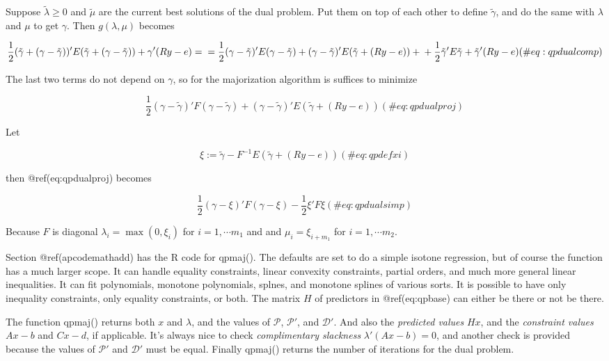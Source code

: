 \documentclass[
  12pt,
  letterpaper,
  DIV=11,
  numbers=noendperiod]{scrreprt}
\theoremstyle{remark}
\begin{document}
Suppose \(\tilde\lambda\geq 0\) and \(\tilde\mu\) are the current best
solutions of the dual problem. Put them on top of each other to define
\(\tilde\gamma\), and do the same with \(\lambda\) and \(\mu\) to get
\(\gamma\). Then \(g(\lambda,\mu)\) becomes

\begin{equation}
\frac12 (\tilde\gamma+(\gamma-\tilde\gamma))'E(\tilde\gamma+(\gamma-\tilde\gamma))+\gamma'(Ry-e)=\\
=\frac12(\gamma-\tilde\gamma)'E(\gamma-\tilde\gamma)+ (\gamma-\tilde\gamma)'E(\tilde\gamma+(Ry-e))+\\+\frac12\tilde\gamma'E\tilde\gamma+\tilde\gamma'(Ry-e)
(\#eq:qpdualcomp)
\end{equation}

The last two terms do not depend on \(\gamma\), so for the majorization
algorithm is suffices to minimize

\begin{equation}
\frac12(\gamma-\tilde\gamma)'F(\gamma-\tilde\gamma)+ (\gamma-\tilde\gamma)'E(\tilde\gamma+(Ry-e))
(\#eq:qpdualproj)
\end{equation}

Let

\begin{equation}
\xi:=\tilde\gamma-F^{-1}E(\tilde\gamma+(Ry-e))
(\#eq:qpdefxi)
\end{equation}

then @ref(eq:qpdualproj) becomes

\begin{equation}
\frac12(\gamma-\xi)'F(\gamma-\xi)-\frac12\xi'F\xi
(\#eq:qpdualsimp)
\end{equation}

Because \(F\) is diagonal \(\lambda_i=\max(0,\xi_i)\) for
\(i=1,\cdots m_1\) and and \(\mu_i=\xi_{i+m_1}\) for \(i=1,\cdots m_2\).

Section @ref(apcodemathadd) has the R code for qpmaj(). The defaults are
set to do a simple isotone regression, but of course the function has a
much larger scope. It can handle equality constraints, linear convexity
constraints, partial orders, and much more general linear inequalities.
It can fit polynomials, monotone polynomials, splnes, and monotone
splines of various sorts. It is possible to have only inequality
constraints, only equality constraints, or both. The matrix \(H\) of
predictors in @ref(eq:qpbase) can either be there or not be there.

The function qpmaj() returns both \(x\) and \(\lambda\), and the values
of \(\mathcal{P}\), \(\mathcal{P}'\), and \(\mathcal{D}'\). And also the
\emph{predicted values} \(Hx\), and the \emph{constraint values}
\(Ax-b\) and \(Cx-d\), if applicable. It's always nice to check
\emph{complimentary slackness} \(\lambda'(Ax-b)=0\), and another check
is provided because the values of \(\mathcal{P}'\) and \(\mathcal{D}'\)
must be equal. Finally qpmaj() returns the number of iterations for the
dual problem.
\end{document}
